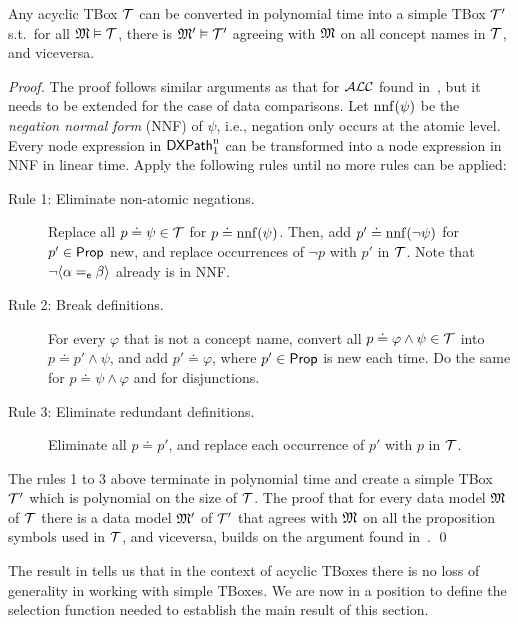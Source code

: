 \begin{lemma}\label{lemma:ext-tbox}
    Any acyclic TBox $\mathcal{T}$ can be converted in polynomial time into a simple TBox $\mathcal{T}'$ s.t.\ for all $\mathfrak{M} \vDash \mathcal{T}$, there is ${\mathfrak{M}' \vDash \mathcal{T}'}$ agreeing with $\mathfrak{M}$ on all concept names in $\mathcal{T}$, and viceversa.
\end{lemma}
\begin{proof}
    The proof follows similar arguments as that for $\mathcal{ALC}$ found in~\cite{Lutz02}, but it needs to be extended for the case of data comparisons.
    Let $\operatorname{nnf}(\psi)$ be the \emph{negation normal form} (NNF) of $\psi$, i.e., negation only occurs at the atomic level.  Every node expression in $\mathsf{DXPath}_{\rm 1}^{\rm n}$ can be transformed into a node expression in NNF in linear time. 
    Apply the following rules until no more rules can be applied:
    
    \begin{description}
        \item[Rule 1: Eliminate non-atomic negations.]
        Replace all $p\doteq\psi\in\mathcal{T}$ for $p\doteq\operatorname{nnf}(\psi)$.
        Then, add $p'\doteq\operatorname{nnf}(\neg\psi)$ for $p'\in\mathsf{Prop}$ new, and replace occurrences of $\lnot{p}$ with $p'$ in $\mathcal{T}$.
        Note that $\neg\langle{\alpha=_{\mathsf{e}}\beta}\rangle$ already is in NNF.
 
        \item[Rule 2: Break definitions.]
        For every $\varphi$ that is not a concept name, convert all ${p\doteq\varphi\wedge\psi} \in\mathcal{T}$ into $p\doteq p'\land\psi$, and add $p'\doteq\varphi$, where $p' \in \mathsf{Prop}$ is new each time. Do the same for $p\doteq\psi\wedge\varphi$ and for disjunctions.

        \item[Rule 3: Eliminate redundant definitions.]
        Eliminate all $p \doteq p'$, and replace each occurrence of $p'$ with $p$ in $\mathcal{T}$.
    \end{description}
    The rules 1 to 3 above terminate in polynomial time and create a simple TBox $\mathcal{T}'$ which is polynomial on the size of $\mathcal{T}$.
    The proof that for every data model $\mathfrak{M}$ of $\mathcal{T}$ there is a data model $\mathfrak{M}'$ of $\mathcal{T}'$ that agrees with $\mathfrak{M}$ on all the proposition symbols used in $\mathcal{T}$, and viceversa, builds on the argument found in~\cite{DLbook17,Lutz02}.
    \qed
\end{proof}

The result in  tells us that in the context of acyclic TBoxes there is no loss of generality in working with simple TBoxes. 
We are now in a position to define the selection function needed to establish the main result of this section.

